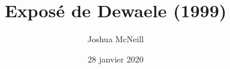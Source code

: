 \documentclass{beamer}
\author{Joshua McNeill}
\date{28 janvier 2020}
\title{Exposé de Dewaele (1999)}
\begin{document}
  \begin{frame}
    \titlepage
  \end{frame}

  \begin{frame}
    \tableofcontents
  \end{frame}
\end{document}
